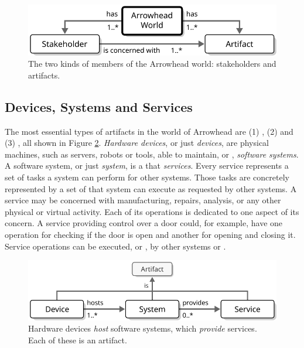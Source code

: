 \vfill

\begin{figure}[ht!]
  \centering
  \includegraphics[scale=0.9]{figures/world}
  \caption{
    The two kinds of members of the Arrowhead world: stakeholders and artifacts.
  }
  \label{fig:world}
\end{figure}

\vspace*{-3mm}

\subsection{Devices, Systems and Services}

The most essential types of artifacts in the world of Arrowhead are (1) , (2)  and (3) , all shown in Figure \ref{fig:device-system-service}.
\textit{Hardware devices}, or just \textit{devices}, are physical machines, such as servers, robots or tools, able to maintain, or , \textit{software systems}.
A software system, or just \textit{system}, is a   that  \textit{services}.
Every service represents a set of tasks a system can perform for other systems.
Those tasks are concretely represented by a set of  that system can execute as requested by other systems.
A service may be concerned with manufacturing, repairs, analysis, or any other physical or virtual activity.
Each of its operations is dedicated to one aspect of its concern.
A service providing control over a door could, for example, have one operation for checking if the door is open and another for opening and closing it.
Service operations can be executed, or , by other systems or .

\vfill

\begin{figure}[ht!]
  \centering
  \includegraphics[scale=0.9]{figures/device-system-service}
  \caption{
    Hardware devices \textit{host} software systems, which \textit{provide} services.
    Each of these is an artifact.
  }
  \label{fig:device-system-service}
\end{figure}

